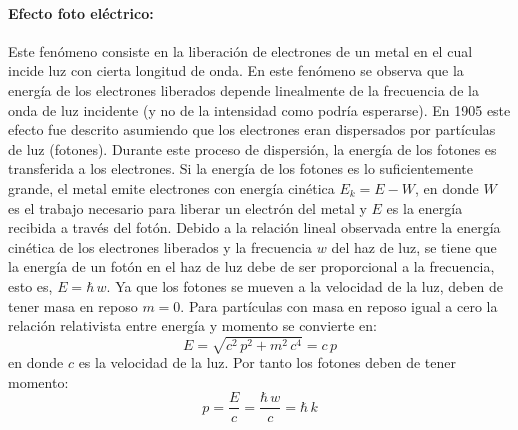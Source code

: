 \documentclass[12pt]{book}
\numberwithin{equation}{chapter}
\begin{document}
\paragraph{Efecto foto el\'ectrico:}
Este fen\'omeno consiste en la liberaci\'on de electrones de un metal en el cual incide luz con cierta longitud de onda. En este fen\'omeno se observa que la energ\'ia de los electrones liberados depende linealmente de la frecuencia de la onda de luz incidente (y no de la intensidad como podr\'ia esperarse). En 1905 este efecto fue descrito asumiendo que los electrones eran dispersados por part\'iculas de luz (fotones). Durante este proceso de dispersi\'on, la energ\'ia de los fotones es transferida a los electrones. Si la energ\'ia de los fotones es lo suficientemente grande, el metal emite electrones con energ\'ia cin\'etica $E_{k}= E - W$, en donde $W$ es el trabajo necesario para liberar un electr\'on del metal y $E$ es la energ\'ia recibida a trav\'es del fot\'on. Debido a la relaci\'on lineal observada entre la energ\'ia cin\'etica de los electrones liberados y la frecuencia $w$ del haz de luz, se tiene que la energ\'ia de un fot\'on en el haz de luz debe de ser proporcional a la frecuencia, esto es, $ E= \hbar \, w $. Ya que los fotones se mueven a la velocidad de la luz, deben de tener masa en reposo $m=0$. Para part\'iculas con masa en reposo igual a cero la relaci\'on relativista entre energ\'ia y momento se convierte en:
\begin{equation}
E= \sqrt{ c^{2}\, p^{2} + m^{2}\, c^{4} } = c\,p 
\end{equation}  
en donde $c$ es la velocidad de la luz. Por tanto los fotones deben de tener momento:
$$ p= \frac{E}{c}= \frac{\hbar \, w}{c} = \hbar \, k $$
\end{document}
